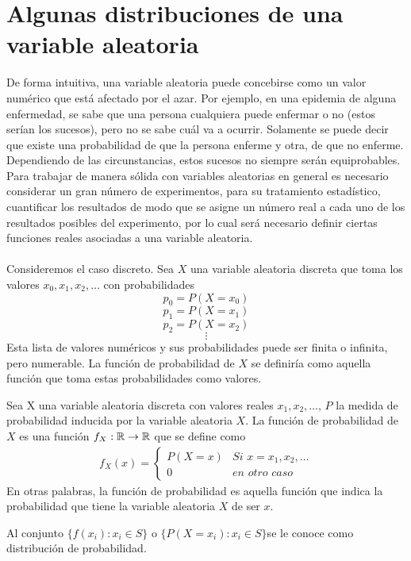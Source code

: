 \section{Algunas distribuciones de una variable aleatoria}
De forma intuitiva, una variable aleatoria puede concebirse como un valor numérico que está afectado por el azar. Por ejemplo, en una epidemia de alguna enfermedad, se sabe que una persona cualquiera puede enfermar o no (estos serían los sucesos), pero no se sabe cuál va a ocurrir. Solamente se puede decir que existe una probabilidad de que la persona enferme y otra, de que no enferme. Dependiendo de las circunstancias, estos sucesos no siempre serán equiprobables.\\
Para trabajar de manera sólida con variables aleatorias en general es necesario considerar un gran número de experimentos, para su tratamiento estadístico, cuantificar los resultados de modo que se asigne un número real a cada uno de los resultados posibles del experimento, por lo cual será necesario definir ciertas funciones reales asociadas a una variable aleatoria.
\\ \\
Consideremos el caso discreto. Sea $X$ una variable aleatoria discreta que toma los valores $x_0,x_1,x_2,\ldots$ con probabilidades
$$p_0=P(X=x_0)$$
$$p_1=P(X=x_1)$$
$$p_2=P(X=x_2)$$
$$\vdots$$
Esta lista de valores numéricos y sus probabilidades puede ser finita o infinita, pero numerable. La función de probabilidad de $X$ se definiría como aquella función que toma estas probabilidades como valores.
\begin{Def}
    Sea X una variable aleatoria discreta con valores reales $x_1,x_2,\ldots$, $P$ la medida de probabilidad inducida por la variable aleatoria $X$. La función de probabilidad de $X$ es una función  $f_{X}:{\mathbb{R}}\rightarrow{\mathbb{R}}$ que se define como
    \begin{eqnarray}
        f_{X}(x)=
        \begin{cases}
            P(X=x) &\textit{Si }x=x_1,x_2,\ldots\\0 &\textit{en otro caso}\label{def-funcionProbabilidad}
        \end{cases}
    \end{eqnarray}
    En otras palabras, la función de probabilidad es aquella función que indica la probabilidad que tiene la variable aleatoria $X$ de ser $x$.
\end{Def}
\begin{Def}
\label{def-distribuciónProb}
    Al conjunto $\{f(x_i): x_i\in S\}$ o $\{P(X=x_i): x_i\in S\} $se le conoce como distribución de probabilidad.
\end{Def}
